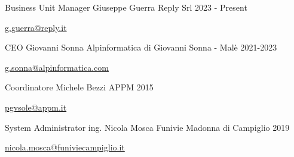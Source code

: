 

\begin{cventries}

\cventry
{Business Unit Manager} %
{Giuseppe Guerra} %
{Reply Srl} %
{2023 - Present} %
{
  \begin{cvitems} %
    \item {\href{mailto:g.guerra@reply.it}{g.guerra@reply.it}}
  \end{cvitems}
}

\cventry
{CEO} %
{Giovanni Sonna} %
{Alpinformatica di Giovanni Sonna - Malè} %
{2021-2023} %
{
  \begin{cvitems} %
    \item {\href{mailto:g.sonna@alpinformatica.com}{g.sonna@alpinformatica.com}}
  \end{cvitems}
}

  \cventry
    {Coordinatore} %
    {Michele Bezzi} %
    {APPM} %
    {2015} %
    {
      \begin{cvitems} %
        \item {\href{mailto:pgvsole@appm.it}{pgvsole@appm.it}}
      \end{cvitems}
    }

  \cventry
    {System Administrator} %
    {ing. Nicola Mosca} %
    {Funivie Madonna di Campiglio} %
    {2019} %
    {
      \begin{cvitems} %
        \item {\href{mailto:nicola.mosca@funiviecampiglio.it}{nicola.mosca@funiviecampiglio.it}}
      \end{cvitems}
    }


\end{cventries}
